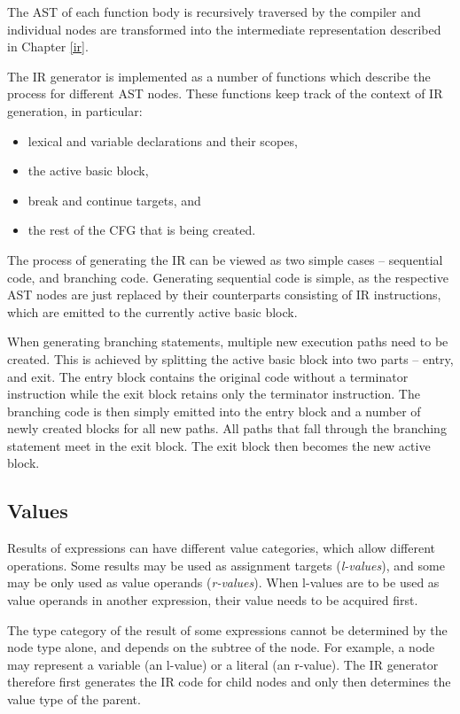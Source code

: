 The AST of each function body is recursively traversed by the compiler and individual nodes are transformed into the intermediate representation described in Chapter \ref{ir}.

The IR generator is implemented as a number of functions which describe the process for different AST nodes. These functions keep track of the context of IR generation, in particular:

\begin{itemize}[noitemsep]
    \item lexical and variable declarations and their scopes,
    \item the active basic block,
    \item break and continue targets, and
    \item the rest of the CFG that is being created.
\end{itemize}

The process of generating the IR can be viewed as two simple cases -- sequential code, and branching code. Generating sequential code is simple, as the respective AST nodes are just replaced by their counterparts consisting of IR instructions, which are emitted to the currently active basic block.

When generating branching statements, multiple new execution paths need to be created. This is achieved by splitting the active basic block into two parts -- entry, and exit. The entry block contains the original code without a terminator instruction while the exit block retains only the terminator instruction. The branching code is then simply emitted into the entry block and a number of newly created blocks for all new paths. All paths that fall through the branching statement meet in the exit block. The exit block then becomes the new active block.


\subsection{Values}

Results of expressions can have different value categories, which allow different operations. Some results may be used as assignment targets (\textit{l-values}), and some may be only used as value operands (\textit{r-values}). When l-values are to be used as value operands in another expression, their value needs to be acquired first.

The type category of the result of some expressions cannot be determined by the node type alone, and depends on the subtree of the node. For example, a \nonterminal[PrimaryExpression]{}{} node may represent a variable (an l-value) or a literal (an r-value). The IR generator therefore first generates the IR code for child nodes and only then determines the value type of the parent.

